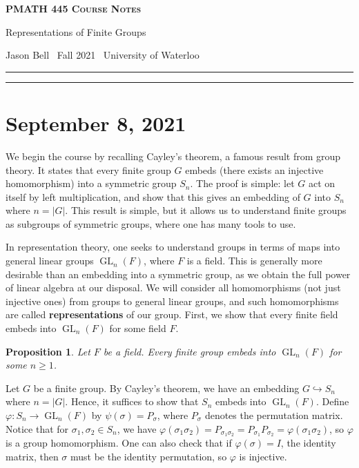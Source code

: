 \documentclass[10pt]{article}
\makeatletter
\numberwithin{equation}{section}
\DeclareMathOperator{\GL}{GL}
\newcommand{\newtitle}[4]{
  \begin{center}
	\huge{\textbf{\textsc{#1 Course Notes}}}
    
	\large{\sc #2}
    
	{\sc #3 \textbullet\, #4 \textbullet\, University of Waterloo}
	\normalsize\vspace{1cm}\hrule
  \end{center}
}
\theoremstyle{newstyle}
\newtheorem{prop}[thm]{Proposition}
\newenvironment{pf}[1][\proofname]{\par
  \pushQED{\qed}%
  \normalfont \topsep0\p@\relax
  \trivlist
  \item[\hskip\labelsep\scshape
  #1\@addpunct{.}]\ignorespaces
}{%
  \popQED\endtrivlist\@endpefalse
}
\makeatother
\begin{document}
\pagestyle{fancy}
\newtitle{PMATH 445}{Representations of Finite Groups}{Jason Bell}{Fall 2021}

\tableofcontents
\vspace{1cm}\hrule
\fancyhead[R]{\nouppercase\rightmark}
\newpage 
{}

\section{September 8, 2021}

We begin the course by recalling Cayley's theorem, a famous result from group theory. It states that 
every finite group $G$ embeds (there exists an injective homomorphism) into a symmetric group $S_n$. 
The proof is simple: let $G$ act on itself by left multiplication, and show that this gives an 
embedding of $G$ into $S_n$ where $n = |G|$. This result is simple, but it allows us to understand 
finite groups as subgroups of symmetric groups, where one has many tools to use. 

In representation theory, one seeks to understand groups in terms of maps into general linear groups 
$\GL_n(F)$, where $F$ is a field. This is generally more desirable than an embedding into 
a symmetric group, as we obtain the full power of linear algebra at our disposal. We will consider 
all homomorphisms (not just injective ones) from groups to general linear groups, and such 
homomorphisms are called {\bf representations} of our group. First, we show that 
every finite field embeds into $\GL_n(F)$ for some field $F$.

\begin{prop}
Let $F$ be a field. Every finite group embeds into $\GL_n(F)$ for some $n \geq 1$. 
\end{prop}
\begin{pf}
Let $G$ be a finite group. By Cayley's theorem, we have an embedding $G \hookrightarrow S_n$ 
where $n = |G|$. Hence, it suffices to show that $S_n$ embeds into $\GL_n(F)$. Define 
$\varphi : S_n \to \GL_n(F)$ by $\psi(\sigma) = P_\sigma$, where $P_\sigma$ denotes the permutation matrix. Notice that for $\sigma_1, \sigma_2 \in S_n$, we have $\varphi(\sigma_1\sigma_2) 
= P_{\sigma_1\sigma_2} = P_{\sigma_1}P_{\sigma_2} = \varphi(\sigma_1\sigma_2)$, so $\varphi$ is a 
group homomorphism. One can also check that if $\varphi(\sigma) = I$, the identity matrix, then 
$\sigma$ must be the identity permutation, so $\varphi$ is injective.
\end{pf}
\end{document}
